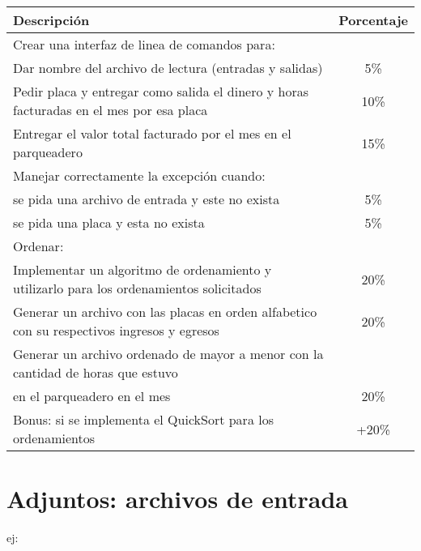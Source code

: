 \begin{tabular}{|l|c|}

  \hline
  \textbf{Descripción} & \textbf{Porcentaje}\\
  \hline
  Crear una interfaz de linea de comandos para: & \\
  Dar nombre del archivo de lectura (entradas y salidas) & 5\%\\
  Pedir placa y entregar como salida el dinero y horas facturadas en el mes por esa placa & 10\% \\
  Entregar el valor total facturado por el mes en el parqueadero & 15\%\\
  \hline
  Manejar correctamente la excepción cuando: & \\
  se pida una archivo de entrada y este no exista & 5\%\\
  se pida una placa y esta no exista & 5\% \\ 
  \hline
  Ordenar: & \\
  Implementar un algoritmo de ordenamiento y utilizarlo para los ordenamientos solicitados  & 20\% \\
  Generar un archivo con las placas en orden alfabetico con su respectivos ingresos y egresos & 20\%\\
  Generar un archivo ordenado de mayor a menor con la cantidad de horas que estuvo & \\
  en el parqueadero en el mes & 20\% \\
  \hline
  Bonus: si se implementa el QuickSort para los ordenamientos  & +20\% \\
  \hline
\end{tabular}


\newpage

\section{Adjuntos: archivos de entrada}

ej:\\




